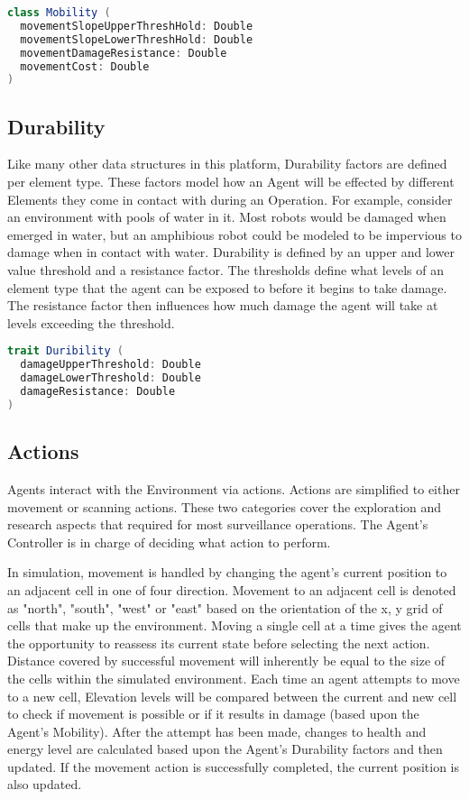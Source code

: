 \begin{lstlisting}[language=Scala]
class Mobility (
  movementSlopeUpperThreshHold: Double
  movementSlopeLowerThreshHold: Double
  movementDamageResistance: Double
  movementCost: Double
)
\end{lstlisting}

\subsection{Durability}
Like many other data structures in this platform, Durability factors are defined per element type.
These factors model how an Agent will be effected by different Elements they come in contact with during an Operation.
For example, consider an environment with pools of water in it.
Most robots would be damaged when emerged in water, but an amphibious robot could be modeled to be impervious to damage when in contact with water.
Durability is defined by an upper and lower value threshold and a resistance factor.
The thresholds define what levels of an element type that the agent can be exposed to before it begins to take damage.
The resistance factor then influences how much damage the agent will take at levels exceeding the threshold.

\begin{lstlisting}[language=Scala]
trait Duribility (
  damageUpperThreshold: Double
  damageLowerThreshold: Double
  damageResistance: Double
)
\end{lstlisting}


\subsection{Actions}
Agents interact with the Environment via actions.
Actions are simplified to either movement or scanning actions.
These two categories cover the exploration and research aspects that required for most surveillance operations.
The Agent's Controller is in charge of deciding what action to perform.

In simulation, movement is handled by changing the agent's current position to an adjacent cell in one of four direction.
Movement to an adjacent cell is denoted as "north", "south", "west" or "east" based on the orientation of the x, y grid of cells that make up the environment. 
Moving a single cell at a time gives the agent the opportunity to reassess its current state before selecting the next action.
Distance covered by successful movement will inherently be equal to the size of the cells within the simulated environment.
Each time an agent attempts to move to a new cell, Elevation levels will be compared between the current and new cell to check if movement is possible or if it results in damage (based upon the Agent's Mobility).
After the attempt has been made, changes to health and energy level are calculated based upon the Agent's Durability factors and then updated.
If the movement action is successfully completed, the current position is also updated.

